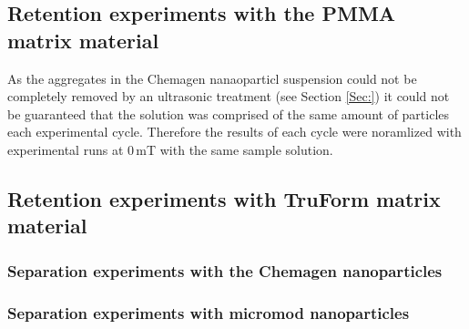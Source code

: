 \subsection{Retention experiments with the PMMA matrix material}
\label{subsec:pmma_res}

As the aggregates in the Chemagen nanaoparticl suspension could not be completely removed by an ultrasonic treatment (see Section \ref{Sec:}) it could not be guaranteed that the solution was comprised of the same amount of particles each experimental cycle. Therefore the results of each cycle were noramlized with experimental runs at 0\,mT with the same sample solution.  


\subsection{Retention experiments with TruForm matrix material}
\label{subsec:trufrom_res}

\subsubsection{Separation experiments with the Chemagen nanoparticles}
\label{subsubsec:chemagen_res}

\subsubsection{Separation experiments with micromod nanoparticles}
\label{subsubsec:micromod_res}